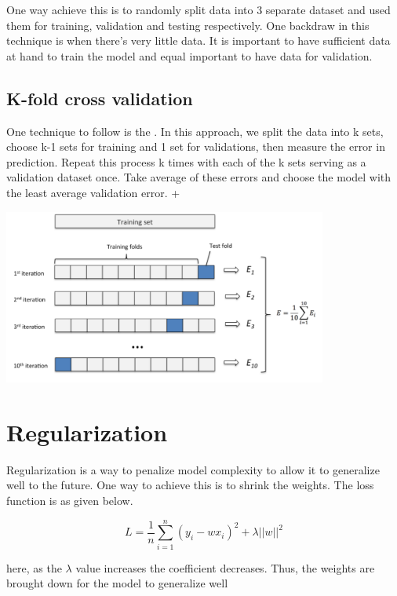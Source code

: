 One way achieve this is to randomly split data into 3 separate dataset and used them for training, validation and testing respectively. One backdraw in this technique is when there's very little data. It is important to have sufficient data at hand to train the model and equal important to have data for validation.

\subsection{K-fold cross validation}

One technique to follow is the . In this approach, we split the data into k sets, choose k-1 sets for training and 1 set for validations, then measure the error in prediction. Repeat this process k times with each of the k sets serving as a validation dataset once. Take average of these errors and choose the model with the least average validation error. +

\includegraphics[width=0.8\textwidth]{figures/kfold.PNG}


\section{Regularization}

Regularization is a way to penalize model complexity to allow it to generalize well to the future. One way to achieve this is to shrink the weights. The loss function is as given below.

\begin{equation}
    L = \frac{1}{n}\sum_{i=1}^{n}(y_i - wx_i)^2 + \lambda||w||^2
\end{equation}

here, as the $\lambda$ value increases the coefficient decreases. Thus, the weights are brought down for the model to generalize well



